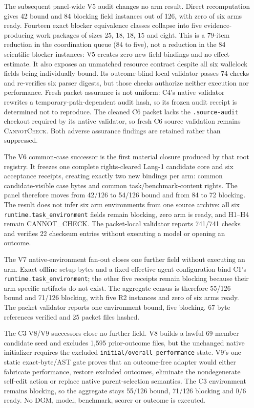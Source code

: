 The subsequent panel-wide V5 audit changes no arm result. Direct recomputation
gives 42 bound and 84 blocking field instances out of 126, with zero of six
arms ready. Fourteen exact blocker equivalence classes collapse into five
evidence-producing work packages of sizes 25, 18, 18, 15 and eight. This is a
79-item reduction in the coordination queue (84 to five), not a reduction in
the 84 scientific blocker instances: V5 creates zero new field bindings and no
effect estimate. It also exposes an unmatched resource contract despite all
six wallclock fields being individually bound. Its outcome-blind local
validator passes 74 checks and re-verifies six parser digests, but those checks
authorize neither execution nor performance. Fresh packet assurance is not
uniform: C4's native validator rewrites a temporary-path-dependent audit hash,
so its frozen audit receipt is determined not to reproduce. The cleaned C6
packet lacks the \texttt{.source-audit} checkout required by its native
validator, so fresh C6 source validation remains \textsc{CannotCheck}. Both
adverse assurance findings are retained rather than suppressed.

The V6 common-case successor is the first material closure produced by that
root registry. It freezes one complete rights-cleared Lang-1 candidate core and
six acceptance receipts, creating exactly two new bindings per arm: common
candidate-visible case bytes and common task/benchmark-content rights. The
panel therefore moves from 42/126 to 54/126 bound and from 84 to 72 blocking.
The result does not infer six arm environments from one source archive: all six
\texttt{runtime.task\_environment} fields remain blocking, zero arm is ready,
and H1--H4 remain \textsf{CANNOT\_CHECK}. The packet-local validator reports
741/741 checks and verifies 22 checksum entries without executing a model or
opening an outcome.

The V7 native-environment fan-out closes one further field without executing
an arm. Exact offline setup bytes and a fixed effective agent configuration
bind C1's \texttt{runtime.task\_environment}; the other five receipts remain
blocking because their arm-specific artifacts do not exist. The aggregate
census is therefore 55/126 bound and 71/126 blocking, with five R2 instances
and zero of six arms ready. The packet validator reports one environment bound,
five blocking, 67 byte references verified and 25 packet files hashed.

The C3 V8/V9 successors close no further field. V8 builds a lawful 69-member
candidate seed and excludes 1,595 prior-outcome files, but the unchanged native
initializer requires the excluded \texttt{initial/overall\_performance} state.
V9's one static exact-byte/AST gate proves that an outcome-free adapter would
either fabricate performance, restore excluded outcomes, eliminate the
nondegenerate self-edit action or replace native parent-selection semantics.
The C3 environment remains blocking, so the aggregate stays 55/126 bound,
71/126 blocking and 0/6 ready. No DGM, model, benchmark, scorer or outcome is
executed.

